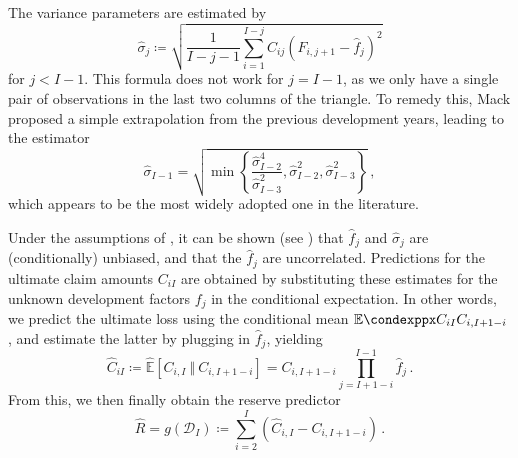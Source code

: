 \documentclass[a4paper]{book}
\begin{document}
The variance parameters are estimated by
\begin{equation}
  \widehat{\sigma}_j \coloneqq \sqrt{\frac{1}{I - j - 1}\sum_{i = 1}^{I-j} C_{ij}\left( F_{i, j + 1} - \widehat{f}_j \right)^2}
\end{equation}
for $j < I - 1$. This formula does not work for $j = I - 1$, as we only have a single pair of observations in the last two columns of the triangle. To remedy this, Mack proposed a simple extrapolation from the previous development years, leading to the estimator
\begin{equation}
  \widehat{\sigma}_{I - 1} = \sqrt{\min{ \left \{ \frac{\widehat{\sigma}^4_{I - 2}}{\widehat{\sigma}^2_{I - 3}}, \widehat{\sigma}^2_{I - 2}, \widehat{\sigma}^2_{I - 3} \right \} }} \,,
\end{equation}
which appears to be the most widely adopted one in the literature.

Under the assumptions of , it can be shown (see \cite[Lemma 2.5 and Lemma 3.5]{wuthrich:stochastic-reserving}) that $\widehat{f}_j$ and $\widehat{\sigma}_j$ are (conditionally) unbiased, and that the $\widehat{f}_j$ are uncorrelated. Predictions for the ultimate claim amounts $C_{iI}$ are obtained by substituting these estimates for the unknown development factors $f_j$ in the conditional expectation. In other words, we predict the ultimate loss using the conditional mean $\condexpp{C_{iI}}{C_{i, I + 1 - i}}$, and estimate the latter by plugging in $\widehat{f}_j$, yielding
\begin{equation}
  \widehat{C}_{iI} \coloneqq \widehat{\mathbb{E}}[C_{i, I} \ \Vert \ C_{i, I + 1 - i}] = C_{i, I + 1 - i} \prod_{j = I + 1 - i}^{I - 1} \widehat{f}_j \,.
\end{equation}
From this, we then finally obtain the reserve predictor 
\begin{equation} \label{eq:reserve-predictor}
  \widehat{R} = g(\mathcal{D}_I) \coloneqq \sum_{i = 2}^I (\widehat{C}_{i, I} - C_{i, I + 1- i}) \,.
\end{equation}
\end{document}
